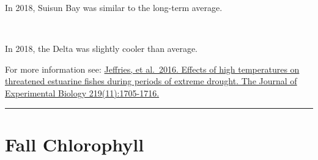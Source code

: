 \documentclass[
]{book}
\begin{document}
\begin{panel-grid}
\begin{columns-nocenter}
\begin{column40}
\end{column40}

\begin{column800}

In 2018, Suisun Bay was similar to the long-term average.

\end{column800}

\begin{column40}

~

\end{column40}

\begin{column800}

In 2018, the Delta was slightly cooler than average.

\end{column800}

\end{columns-nocenter}

\end{panel-grid}

\begin{disclaimer}
For more information see:
\href{https://jeb.biologists.org/content/219/11/1705.short}{Jeffries, et
al.~2016. Effects of high temperatures on threatened estuarine fishes
during periods of extreme drought. The Journal of Experimental Biology
219(11):1705-1716.}
\end{disclaimer}

\begin{center}\rule{0.5\linewidth}{0.5pt}\end{center}

\hypertarget{fall-chlorophyll}{%
\section{Fall Chlorophyll}\label{fall-chlorophyll}}
\end{document}
